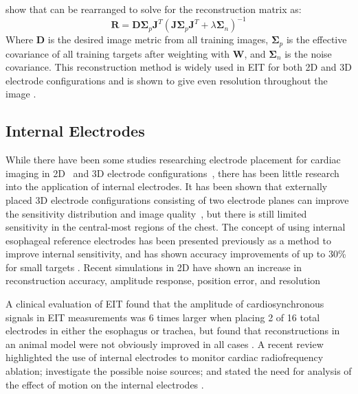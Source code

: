 show that  can 
be rearranged to solve for the reconstruction matrix
as:
\begin{equation} 
	\mathbf{R} = \mathbf{D}  
	\mathbf{\Sigma}_p \mathbf{J}^T(\mathbf{J}  
	 \mathbf{\Sigma}_p  \mathbf{J}^T + 
	 \lambda \mathbf{\Sigma}_n)^{-1}
\end{equation}
Where $\mathbf{D}$ is the desired image metric from all training images,
$\mathbf{\Sigma}_p$  is the effective covariance of all training targets after weighting with 
$\mathbf{W}$, and 
$\mathbf{\Sigma}_n$ is the noise covariance. 
This reconstruction method is widely used in EIT for both 2D and 3D electrode configurations 
and is shown to give even resolution throughout the image \parencite{adler_greit_2009}.

\subsection{Internal Electrodes}

While there have been some studies researching electrode placement for cardiac
imaging in 2D~\parencite{vonk_noordegraaf_improvement_1996} and 
3D electrode configurations~\parencite{graham_electrode_2007}, there has 
been little research into the application of internal electrodes. 
It has been shown that externally placed 3D electrode configurations
consisting of two electrode planes
can improve the sensitivity distribution and image quality~\parencite{grychtol_3d_2016},
but there is still limited sensitivity in the central-most regions 
of the chest.
The concept of using internal esophageal reference electrodes has been presented
previously
\parencite{pilkington_utilization_1989,schuessler_utility_1995}
as a method to improve internal sensitivity, and has shown
accuracy improvements of up to 30\% for small 
targets \parencite{pilkington_utilization_1989}.
Recent simulations in 2D have shown an increase in reconstruction 
accuracy, amplitude response, position error, and resolution
\parencite{nasehi_tehrani_modelling_2012,nasehi_tehrani_evaluation_2012}

A clinical evaluation of EIT found that the amplitude of cardiosynchronous signals 
in EIT measurements was 6 times larger when placing 2 of 16 total electrodes in 
either the esophagus or trachea, but found that reconstructions 
in an animal model were not obviously improved in all cases \parencite{czaplik_application_2014}.
A recent review highlighted the use of internal electrodes to monitor cardiac radiofrequency
ablation; investigate the possible noise sources; and 
stated the need for analysis of the effect of motion on the 
internal electrodes
\parencite{nguyen_electrical_2020}.

